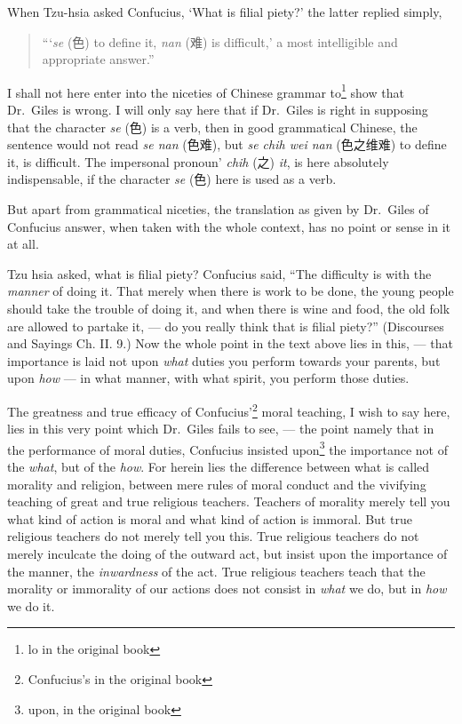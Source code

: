 When Tzu-hsia  asked Confucius, `What is filial piety?' the latter replied simply,
\begin{quote}\footnotesize
``\thinspace`\emph{se} (色) to define it, \emph{nan} (难) is difficult,' a most intelligible and appropriate answer.''
\end{quote}

I shall not here enter into the niceties of Chinese grammar to\footnote{lo in the original book} show that Dr.~Giles is wrong.
I will only say here that if Dr.~Giles is right in supposing that the character \emph{se} (色) is a verb, then in good grammatical Chinese, the sentence would not read \emph{se nan} (色难), but \emph{se chih wei nan} (色之维难) to define it, is difficult.
The impersonal pronoun' \emph{chih} (之) \emph{it}, is here absolutely indispensable, if the character \emph{se} (色) here is used as a verb.

But apart from grammatical niceties, the translation as given by Dr.~Giles of Confucius answer, when taken with the whole context, has no point or sense in it at all.

Tzu hsia asked, what is filial piety?
Confucius said, ``The difficulty is with the \emph{manner}\cite{num25} of doing it. That merely when there is work to be done, the young people should take the trouble of doing it, and when there is wine and food, the old folk are allowed to partake it, --- do you really think that is filial piety?'' (Discourses and Sayings Ch. II. 9.)
Now the whole point in the text above lies in this, --- that importance is laid not upon \emph{what} duties you perform towards your parents, but upon \emph{how} --- in what manner, with what spirit, you perform those duties.

The greatness and true efficacy of Confucius'\footnote{Confucius's in the original book} moral teaching, I wish to say here, lies in this very point which Dr.~Giles fails to see, --- the point namely that in the performance of moral duties, Confucius insisted upon\footnote{upon, in the original book} the importance not of the \emph{what}, but of the \emph{how}.
For herein lies the difference between what is called morality and religion, between mere rules of moral conduct and the vivifying teaching of great and true religious teachers.
Teachers of morality merely tell you what kind of action is moral and what kind of action is immoral.
But true religious teachers do not merely tell you this.
True religious teachers do not merely inculcate the doing of the outward act, but insist upon the importance of the manner, the \emph{inwardness} of the act.
True religious teachers teach that the morality or immorality of our actions does not consist in \emph{what} we do, but in \emph{how} we do it.

